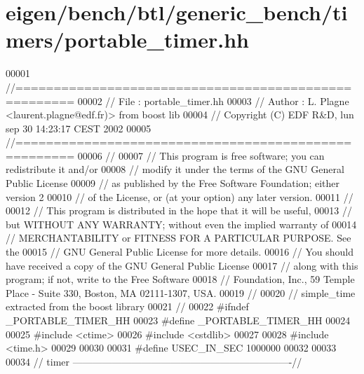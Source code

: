 \hypertarget{eigen_2bench_2btl_2generic__bench_2timers_2portable__timer_8hh_source}{}\section{eigen/bench/btl/generic\+\_\+bench/timers/portable\+\_\+timer.hh}
\label{eigen_2bench_2btl_2generic__bench_2timers_2portable__timer_8hh_source}

\begin{DoxyCode}
00001 \textcolor{comment}{//=====================================================}
00002 \textcolor{comment}{// File   :  portable\_timer.hh}
00003 \textcolor{comment}{// Author :  L. Plagne <laurent.plagne@edf.fr)> from boost lib}
00004 \textcolor{comment}{// Copyright (C) EDF R&D,  lun sep 30 14:23:17 CEST 2002}
00005 \textcolor{comment}{//=====================================================}
00006 \textcolor{comment}{//}
00007 \textcolor{comment}{// This program is free software; you can redistribute it and/or}
00008 \textcolor{comment}{// modify it under the terms of the GNU General Public License}
00009 \textcolor{comment}{// as published by the Free Software Foundation; either version 2}
00010 \textcolor{comment}{// of the License, or (at your option) any later version.}
00011 \textcolor{comment}{//}
00012 \textcolor{comment}{// This program is distributed in the hope that it will be useful,}
00013 \textcolor{comment}{// but WITHOUT ANY WARRANTY; without even the implied warranty of}
00014 \textcolor{comment}{// MERCHANTABILITY or FITNESS FOR A PARTICULAR PURPOSE.  See the}
00015 \textcolor{comment}{// GNU General Public License for more details.}
00016 \textcolor{comment}{// You should have received a copy of the GNU General Public License}
00017 \textcolor{comment}{// along with this program; if not, write to the Free Software}
00018 \textcolor{comment}{// Foundation, Inc., 59 Temple Place - Suite 330, Boston, MA  02111-1307, USA.}
00019 \textcolor{comment}{//}
00020 \textcolor{comment}{//  simple\_time extracted from the boost library}
00021 \textcolor{comment}{//}
00022 \textcolor{preprocessor}{#ifndef \_PORTABLE\_TIMER\_HH}
00023 \textcolor{preprocessor}{#define \_PORTABLE\_TIMER\_HH}
00024 
00025 \textcolor{preprocessor}{#include <ctime>}
00026 \textcolor{preprocessor}{#include <cstdlib>}
00027 
00028 \textcolor{preprocessor}{#include <time.h>}
00029 
00030 
00031 \textcolor{preprocessor}{#define USEC\_IN\_SEC 1000000}
00032 
00033 
00034 \textcolor{comment}{//  timer  -------------------------------------------------------------------//}

\end{DoxyCode}
